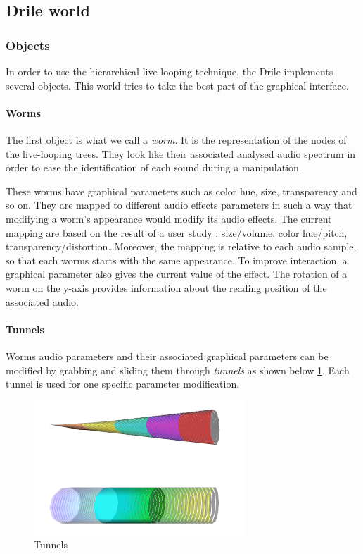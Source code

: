 \subsection{Drile world} 
 \subsubsection{Objects}
 In order to use the hierarchical live looping technique, the Drile implements several objects. This world tries to take the best part of the graphical interface.
\paragraph{Worms}    
 The first object is what we call a \textit{worm}. It is the representation of the nodes of the live-looping trees. They look like their associated analysed audio spectrum in order to ease the identification of each sound during a manipulation.
  
These worms have graphical parameters such as color hue, size, transparency and so on. They are mapped to different audio effects parameters in such a way that modifying a worm's appearance would modify its audio effects. The current mapping are based on the result of a user study : size/volume, color hue/pitch, transparency/distortion\dots Moreover, the mapping is relative to each audio sample, so that each worms starts with the same appearance. To improve interaction, a graphical parameter also gives the current value of the effect. The rotation of a worm on the y-axis provides information about the reading position of the associated audio.

\paragraph{Tunnels}    
Worms audio parameters and their associated graphical parameters can be modified by grabbing and sliding them through \textit{tunnels} as shown below \ref{fig:tunnel}. Each tunnel is used for one specific parameter modification.

\begin{figure}[h!]
\centering\includegraphics[scale=0.55]{image/tunnels.png}
\caption{Tunnels}
\label{fig:tunnel}
\end{figure} 

